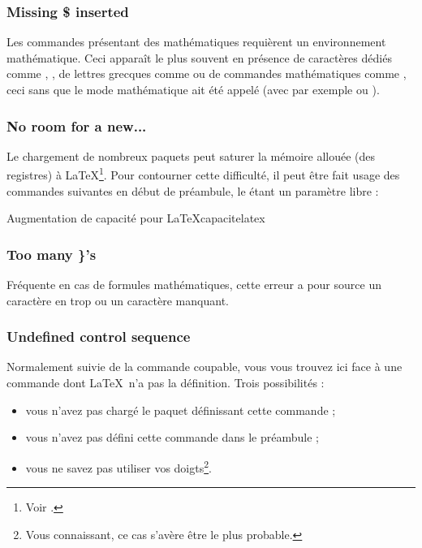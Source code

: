 \subsubsection{Missing \$ inserted}

Les commandes présentant des mathématiques requièrent un environnement mathématique. Ceci apparaît le plus souvent en présence de caractères dédiés comme \macron{\_}, \macron{\^{}}, de lettres grecques comme  ou de commandes mathématiques comme , ceci sans que le mode mathématique ait été appelé (avec par exemple \macron{\$} ou \macro{[}). 


\subsubsection{No room for a new...} 

Le chargement de nombreux paquets peut saturer la mémoire allouée (des registres) à \LaTeX\footnote{Voir  .}. Pour contourner cette difficulté, il peut être fait usage des commandes suivantes en début de préambule, le  étant un paramètre libre :

\begin{codesimple}{Augmentation de capacité pour \LaTeX}{capacitelatex}
\usepackage{etex}
\end{codesimple}


\subsubsection{Too many \}'s} 

Fréquente en cas de formules mathématiques, cette erreur a pour source un caractère \macron{\}} en trop ou un caractère \macron{\{} manquant.


\subsubsection{Undefined control sequence} 

Normalement suivie de la commande coupable, vous vous trouvez ici face à une commande dont \LaTeX\ n'a pas la définition. Trois possibilités : 
\begin{itemize}
\item vous n'avez pas chargé le paquet définissant cette commande ;
\item vous n'avez pas défini cette commande dans le préambule ;
\item vous ne savez pas utiliser vos doigts\footnote{Vous connaissant, ce cas s'avère être le plus probable.}.
\end{itemize}